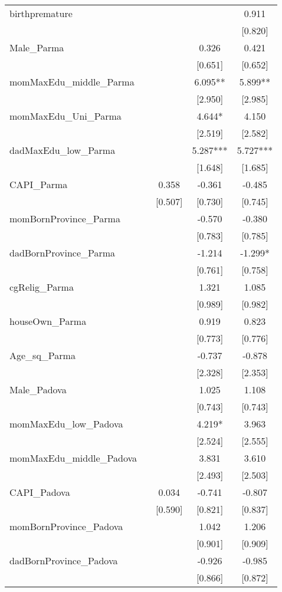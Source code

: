 \documentclass[]{article}
\begin{document}
\begin{tabular}{lcccc}
birthpremature &  &  &  & 0.911 \\
 &  &  &  & [0.820] \\
Male\_Parma &  &  & 0.326 & 0.421 \\
 &  &  & [0.651] & [0.652] \\
momMaxEdu\_middle\_Parma &  &  & 6.095** & 5.899** \\
 &  &  & [2.950] & [2.985] \\
momMaxEdu\_Uni\_Parma &  &  & 4.644* & 4.150 \\
 &  &  & [2.519] & [2.582] \\
dadMaxEdu\_low\_Parma &  &  & 5.287*** & 5.727*** \\
 &  &  & [1.648] & [1.685] \\
CAPI\_Parma &  & 0.358 & -0.361 & -0.485 \\
 &  & [0.507] & [0.730] & [0.745] \\
momBornProvince\_Parma &  &  & -0.570 & -0.380 \\
 &  &  & [0.783] & [0.785] \\
dadBornProvince\_Parma &  &  & -1.214 & -1.299* \\
 &  &  & [0.761] & [0.758] \\
cgRelig\_Parma &  &  & 1.321 & 1.085 \\
 &  &  & [0.989] & [0.982] \\
houseOwn\_Parma &  &  & 0.919 & 0.823 \\
 &  &  & [0.773] & [0.776] \\
Age\_sq\_Parma &  &  & -0.737 & -0.878 \\
 &  &  & [2.328] & [2.353] \\
Male\_Padova &  &  & 1.025 & 1.108 \\
 &  &  & [0.743] & [0.743] \\
momMaxEdu\_low\_Padova &  &  & 4.219* & 3.963 \\
 &  &  & [2.524] & [2.555] \\
momMaxEdu\_middle\_Padova &  &  & 3.831 & 3.610 \\
 &  &  & [2.493] & [2.503] \\
CAPI\_Padova &  & 0.034 & -0.741 & -0.807 \\
 &  & [0.590] & [0.821] & [0.837] \\
momBornProvince\_Padova &  &  & 1.042 & 1.206 \\
 &  &  & [0.901] & [0.909] \\
dadBornProvince\_Padova &  &  & -0.926 & -0.985 \\
 &  &  & [0.866] & [0.872] \\

\end{tabular}
\end{document}
